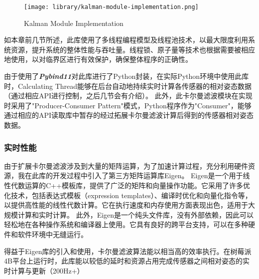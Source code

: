 \begin{figure}[H]
    \centering
    \texttt{[image: library/kalman-module-implementation.png]}
    \caption{\label{fig:kalman-module-implementation}Kalman Module Implementation}
\end{figure}

如本章前几节所述，此库使用了多线程编程模型及线程池技术，以最大限度利用系统资源，提升系统的整体性能与吞吐量。线程锁、原子量等技术也根据需要被相应地使用，以对临界区进行有效保护，确保整体程序的正确性。

由于使用了{\bfseries \itshape Pybind11}对此库进行了Python封装，在实际Python环境中使用此库时，Calculating Thread能够在后台自动地持续实时计算各传感器的相对姿态数据（通过相应API进行控制，之后几节会有介绍）。
此外，此卡尔曼滤波模块在实现时采用了"Producer-Consumer Pattern"模式，Python程序作为"Consumer"，能够通过相应的API读取库中暂存的经过拓展卡尔曼滤波计算后得到的传感器相对姿态数据。

\subsubsection{实时性能}
由于扩展卡尔曼滤波涉及到大量的矩阵运算，为了加速计算过程，充分利用硬件资源，我在此库的开发过程中引入了第三方矩阵运算库Eigen。
Eigen是一个用于线性代数运算的C++模板库，提供了广泛的矩阵和向量操作功能。它采用了许多优化技术，包括表达式模板（expression templates）、编译时优化和向量化指令等，以提供高性能的线性代数计算。它在执行速度和内存使用方面表现出色，适用于大规模计算和实时计算。
此外，Eigen是一个纯头文件库，没有外部依赖，因此可以轻松地在各种操作系统和编译器上使用。它具有良好的跨平台支持，可以在多种硬件和软件环境中无缝运行。

得益于Eigen库的引入和使用，卡尔曼滤波算法能以相当高的效率执行。在树莓派4B平台上运行时，此库能以较低的延时和资源占用完成传感器之间相对姿态的实时计算与更新（200Hz+）

